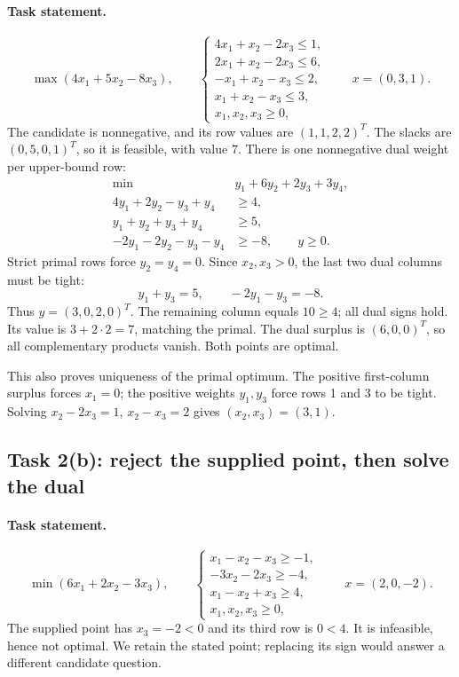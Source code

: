 \documentclass[11pt,a4paper]{article}
\begin{document}
\paragraph{Task statement.}
\[
  \max(4x_1+5x_2-8x_3),\qquad
  \begin{cases}
    4x_1+x_2-2x_3\leq1, \\
    2x_1+x_2-2x_3\leq6, \\
    -x_1+x_2-x_3\leq2,  \\
    x_1+x_2-x_3\leq3,   \\
    x_1,x_2,x_3\geq0,
  \end{cases}
  \qquad x=(0,3,1).
\]
The candidate is nonnegative, and its row values are $(1,1,2,2)^T$.
The slacks are $(0,5,0,1)^T$, so it is feasible, with value $7$.
There is one nonnegative dual weight per upper-bound row:
\[
  \begin{aligned}
    \min\quad&y_1+6y_2+2y_3+3y_4,\\
    4y_1+2y_2-y_3+y_4&\geq4,\\
    y_1+y_2+y_3+y_4&\geq5,\\
    -2y_1-2y_2-y_3-y_4&\geq-8,\qquad y\geq0.
  \end{aligned}
\]
Strict primal rows force $y_2=y_4=0$. Since $x_2,x_3>0$, the last
two dual columns must be tight:
\[
  y_1+y_3=5,\qquad -2y_1-y_3=-8.
\]
Thus $y=(3,0,2,0)^T$. The remaining column equals $10\geq4$;
all dual signs hold. Its value is $3+2\cdot2=7$, matching the primal.
The dual surplus is $(6,0,0)^T$, so all complementary products vanish.
Both points are optimal.

This also proves uniqueness of the primal optimum. The positive first-column
surplus forces $x_1=0$; the positive weights $y_1,y_3$ force rows 1 and 3
to be tight. Solving $x_2-2x_3=1$, $x_2-x_3=2$ gives $(x_2,x_3)=(3,1)$.

\subsection{Task 2(b): reject the supplied point, then solve the dual}
\paragraph{Task statement.}
\[
  \min(6x_1+2x_2-3x_3),\qquad
  \begin{cases}
    x_1-x_2-x_3\geq-1, \\
    -3x_2-2x_3\geq-4,  \\
    x_1-x_2+x_3\geq4,  \\
    x_1,x_2,x_3\geq0,
  \end{cases}
  \qquad x=(2,0,-2).
\]
The supplied point has $x_3=-2<0$ and its third row is $0<4$.
It is infeasible, hence not optimal. We retain the stated point; replacing
its sign would answer a different candidate question.
\end{document}
